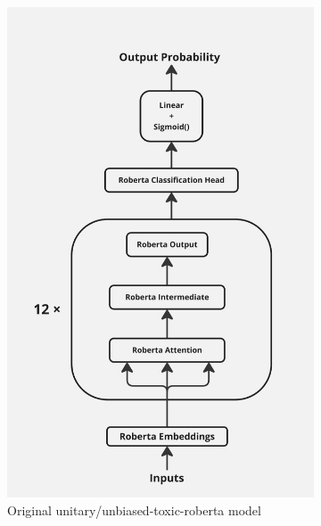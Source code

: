 \begin{figure}[h]
    \centering
    \begin{subfigure}[b]{0.45\linewidth} 
        \centering
        \includegraphics[width=\linewidth]{Images/Screenshot_20241023_113542_Miro.jpg}
        \caption{Original unitary/unbiased-toxic-roberta model}
        \label{fig:org-model}
    \end{subfigure}
    \hfill
    \begin{subfigure}[b]{0.45\linewidth} 
        \centering

\end{subfigure}
\end{figure}
